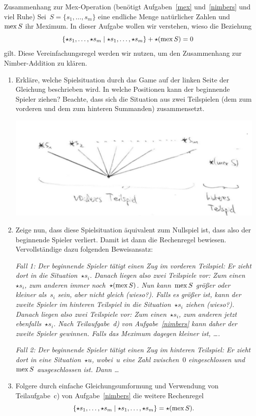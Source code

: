 \documentclass{zirkelblatt}
\begin{document}
\begin{aufgabe}{Zusammenhang zur Mex-Operation (benötigt Aufgaben~\ref{mex}
und~\ref{nimbers} und viel Ruhe)}
\label{zusammenhang-mex}
Sei~$S = \{ s_1,\ldots,s_m \}$ eine endliche Menge natürlicher Zahlen und~$\operatorname{mex}
S$ ihr Meximum. In dieser Aufgabe wollen wir verstehen, wieso die Beziehung
\[ \{ \star s_1,\ldots,\star s_m \mathrel{|} \star s_1,\ldots,\star s_m \} + \star(\operatorname{mex} S)
= 0
\]
gilt. Diese Vereinfachungsregel werden wir nutzen, um den Zusammenhang zur
Nimber-Addition zu klären.
\begin{enumerate}
\item Erkläre, welche Spielsituation durch das Game auf der linken Seite der
Gleichung beschrieben wird. In welche Positionen kann der beginnende Spieler
ziehen? Beachte, dass sich die Situation aus zwei Teilspielen (dem zum vorderen
und dem zum hinteren Summanden) zusammensetzt.
\begin{center}
\includegraphics[scale=0.6]{rechenregel-mex}
\end{center}
\item Zeige nun, dass diese Spielsituation äquivalent zum Nullspiel ist, dass
also der beginnende Spieler verliert. Damit ist dann die Rechenregel bewiesen.
Vervollständige dazu folgenden Beweisansatz:

\emph{Fall 1: Der beginnende Spieler tätigt einen Zug im vorderen Teilspiel: Er
zieht dort in die Situation~$\star s_i$. Danach liegen also zwei Teilspiele
vor: Zum einen~$\star s_i$, zum anderen immer noch~$\star(\operatorname{mex} S)$. Nun
kann~$\operatorname{mex} S$ größer oder kleiner als~$s_i$ sein, aber nicht gleich (wieso?).
Falls es größer ist, kann der zweite Spieler im hinteren Teilspiel in die
Situation~$\star s_i$ ziehen (wieso?). Danach liegen also zwei Teilspiele vor:
Zum einen~$\star s_i$, zum anderen jetzt ebenfalls~$\star s_i$. Nach
Teilaufgabe~d) von Aufgabe~\ref{nimbers} kann daher der zweite Spieler
gewinnen. Falls das Meximum dagegen kleiner ist, \ldots.}

\emph{Fall 2: Der beginnende Spieler tätigt einen Zug im hinteren Teilspiel:
Er zieht dort in eine Situation~$\star u$, wobei~$u$ eine Zahl zwischen~$0$
eingeschlossen und~$\operatorname{mex} S$ ausgeschlossen ist. Dann \ldots}
\item Folgere durch einfache Gleichungsumformung und Verwendung von
Teilaufgabe~c) von Aufgabe~\ref{nimbers} die weitere Rechenregel
\[ \{ \star s_1,\ldots,\star s_m \mathrel{|} \star s_1,\ldots,\star s_m \} = \star(\operatorname{mex}
S). \]
\end{enumerate}
\end{aufgabe}
\end{document}
